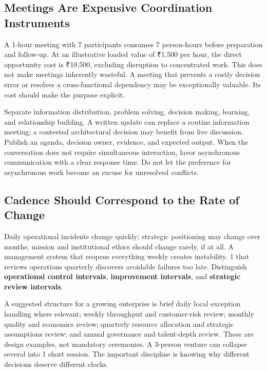\subsection{Meetings Are Expensive Coordination Instruments}
\label{sec:meetings_expensive_coordination}

A 1-hour meeting with 7 participants consumes 7 person-hours before preparation and follow-up. At an illustrative loaded value of ₹1,500 per hour, the direct opportunity cost is ₹10,500, excluding disruption to concentrated work. This does not make meetings inherently wasteful. A meeting that prevents a costly decision error or resolves a cross-functional dependency may be exceptionally valuable. Its cost should make the purpose explicit.

Separate information distribution, problem solving, decision making, learning, and relationship building. A written update can replace a routine information meeting; a contested architectural decision may benefit from live discussion. Publish an agenda, decision owner, evidence, and expected output. When the conversation does not require simultaneous interaction, favor asynchronous communication with a clear response time. Do not let the preference for asynchronous work become an excuse for unresolved conflicts.

\subsection{Cadence Should Correspond to the Rate of Change}
\label{sec:cadence_rate_of_change}

Daily operational incidents change quickly; strategic positioning may change over months; mission and institutional ethics should change rarely, if at all. A management system that reopens everything weekly creates instability. 1 that reviews operations quarterly discovers avoidable failures too late. Distinguish \textbf{operational control intervals}, \textbf{improvement intervals}, and \textbf{strategic review intervals}.

A suggested structure for a growing enterprise is brief daily local exception handling where relevant; weekly throughput and customer-risk review; monthly quality and economics review; quarterly resource allocation and strategic assumptions review; and annual governance and talent-depth review. These are design examples, not mandatory ceremonies. A 3-person venture can collapse several into 1 short session. The important discipline is knowing why different decisions deserve different clocks.

